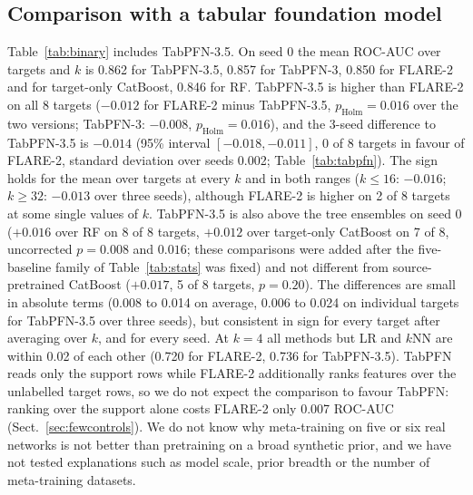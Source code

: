 \documentclass[11pt]{article}
\begin{document}
\subsection{Comparison with a tabular foundation model}
Table~\ref{tab:binary} includes TabPFN-3.5.
On seed 0 the mean ROC-AUC over targets and $k$ is 0.862 for TabPFN-3.5, 0.857 for TabPFN-3, 0.850 for FLARE-2 and for target-only CatBoost, 0.846 for RF.
TabPFN-3.5 is higher than FLARE-2 on all 8 targets ($-0.012$ for FLARE-2 minus TabPFN-3.5, $p_{\text{Holm}}=0.016$ over the two versions; TabPFN-3: $-0.008$, $p_{\text{Holm}}=0.016$), and the 3-seed difference to TabPFN-3.5 is $-0.014$ (95\% interval $[-0.018,-0.011]$, 0 of 8 targets in favour of FLARE-2, standard deviation over seeds 0.002; Table~\ref{tab:tabpfn}).
The sign holds for the mean over targets at every $k$ and in both ranges ($k\le16$: $-0.016$; $k\ge32$: $-0.013$ over three seeds), although FLARE-2 is higher on 2 of 8 targets at some single values of $k$.
TabPFN-3.5 is also above the tree ensembles on seed 0 ($+0.016$ over RF on 8 of 8 targets, $+0.012$ over target-only CatBoost on 7 of 8, uncorrected $p=0.008$ and $0.016$; these comparisons were added after the five-baseline family of Table~\ref{tab:stats} was fixed) and not different from source-pretrained CatBoost ($+0.017$, 5 of 8 targets, $p=0.20$).
The differences are small in absolute terms (0.008 to 0.014 on average, 0.006 to 0.024 on individual targets for TabPFN-3.5 over three seeds), but consistent in sign for every target after averaging over $k$, and for every seed.
At $k=4$ all methods but LR and $k$NN are within 0.02 of each other (0.720 for FLARE-2, 0.736 for TabPFN-3.5).
TabPFN reads only the support rows while FLARE-2 additionally ranks features over the unlabelled target rows, so we do not expect the comparison to favour TabPFN: ranking over the support alone costs FLARE-2 only 0.007 ROC-AUC (Sect.~\ref{sec:fewcontrols}).
We do not know why meta-training on five or six real networks is not better than pretraining on a broad synthetic prior, and we have not tested explanations such as model scale, prior breadth or the number of meta-training datasets.

\begin{table}[t]
\centering\small
\caption{FLARE-2 minus TabPFN in binary ROC-AUC, unit = target (8). W/L: targets where FLARE-2 is higher / lower. Seed 0: $p_{\text{Holm}}$ over the two TabPFN versions within each scope. Three seeds: TabPFN-3.5 only, target-averaged over seeds 0--2, exact Wilcoxon $p$ without correction (rows marked 3 seeds). The last column is $p_{\text{Holm}}$ for seed 0 and uncorrected $p$ for three seeds.}\label{tab:tabpfn}

\end{table}
\end{document}
